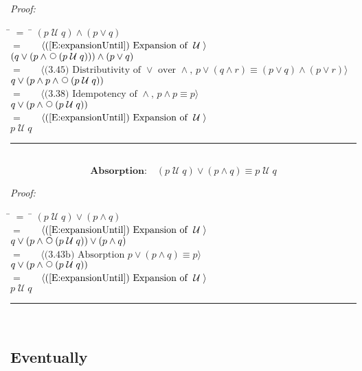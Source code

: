 \documentclass[fleqn, leqno]{article}
\newcommand{\lgap}{2pt}                             %
\newcommand{\mymathindent}{24pt}                    %
\newcommand{\Until}{\;\mathcal{U}\;}
\newcommand{\Next}{\;\,\text{\raisebox{3.5pt}{\circle{6}}}}
\newcommand{\myqed}{\hfill\rule[-.23ex]{1.2ex}{2.0ex}}
\newcommand{\Gll} {\langle}                         %
\newcommand{\Ggg} {\rangle}                         %
\newcommand{\Hint}[1]     {\ \ \ $\Gll              \mbox{#1} \Ggg$ }   %
\begin{document}
\emph{Proof:}
\begin{tabbing}
\hspace{\mymathindent} \= $= \;$ \= \kill
  \> \>   $(p \Until q) \land (p \lor q)$\\[\lgap]
  \> $=$  \>  \Hint{(\ref{E:expansionUntil}) Expansion of $\Until$}\\[\lgap]
  \> \>   $(q \lor (p \land \Next(p \Until q))) \land (p \lor q)$\\[\lgap]
  \> $=$  \>  \Hint{(3.45) Distributivity of $\lor$ over $\land$, $p\lor (q\land r)\equiv (p\lor q)\land (p\lor r)$}\\[\lgap]
  \> \>   $q \lor (p \land p \land \Next(p \Until q))$\\[\lgap]
  \> $=$  \>  \Hint{(3.38) Idempotency of $\land$, $p \land p \equiv p$}\\[\lgap]
  \> \>   $q \lor (p \land \Next(p \Until q))$\\[\lgap]
  \> $=$  \>  \Hint{(\ref{E:expansionUntil}) Expansion of $\Until$}\\[\lgap]
  \> \>   $p \Until q$
\end{tabbing}
\myqed\\[\lgap]

\begin{equation}\label{E:untilOrAnd}
\textbf{Absorption:}\quad (p \Until q) \lor (p \land q) \equiv p \Until q
\end{equation}

\emph{Proof:}
\begin{tabbing}
\hspace{\mymathindent} \= $= \;$ \= \kill
  \> \>   $(p \Until q) \lor (p \land q)$\\[\lgap]
  \> $=$  \>  \Hint{(\ref{E:expansionUntil}) Expansion of $\Until$}\\[\lgap]
  \> \>   $q \lor (p \land \Next(p \Until q)) \lor (p \land q)$\\[\lgap]
  \> $=$  \>  \Hint{(3.43b) Absorption $p \lor (p \land q) \equiv p$}\\[\lgap]
  \> \>   $q \lor (p \land \Next(p \Until q))$\\[\lgap]
  \> $=$  \>  \Hint{(\ref{E:expansionUntil}) Expansion of $\Until$}\\[\lgap]
  \> \>   $p \Until q$
\end{tabbing}
\myqed\\[\lgap]

\subsection{Eventually}
\end{document}
